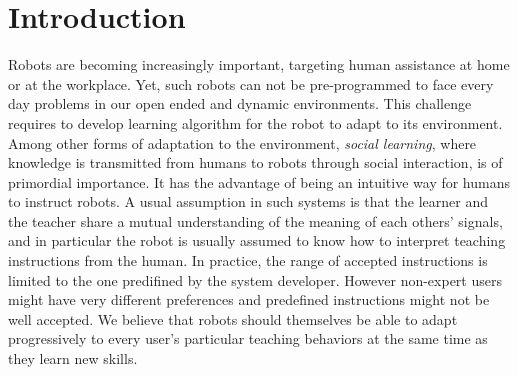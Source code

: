 \section{Introduction}
\label{sec:Introduction}

Robots are becoming increasingly important, targeting human assistance at home or at the workplace. Yet, such robots can not be pre-programmed to face every day problems in our open ended and dynamic environments. This challenge requires to develop learning algorithm for the robot to adapt to its environment. Among other forms of adaptation to the environment, \textit{social learning}, where knowledge is transmitted from humans to robots through social interaction, is of primordial importance. It has the advantage of being an intuitive way for humans to instruct robots. A usual assumption in such systems is that the learner and the teacher share a mutual understanding of the meaning of each others' signals, and in particular the robot is usually assumed to know how to interpret teaching instructions from the human. In practice, the range of accepted instructions is limited to the one predifined by the system developer. However non-expert users might have very different preferences and predefined instructions might not be well accepted. We believe that robots should themselves be able to adapt progressively to every user's particular teaching behaviors at the same time as they learn new skills. %


